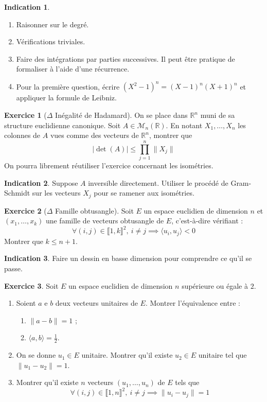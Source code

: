 \documentclass[french]{book}
\newcommand{\R}{\mathbb{R}}
\theoremstyle{definition}
\newtheorem{ex}{Exercice}[chapter]
\theoremstyle{theorem}
\newtheorem*{ind}{Indication}
\theoremstyle{remark}
\begin{document}
\begin{ind}
	\begin{enumerate}
		\item Raisonner sur le degré.
		\item Vérifications triviales.
		\item Faire des intégrations par parties successives. Il peut être pratique de formaliser à l'aide d'une récurrence.
		\item Pour la première question, écrire $(X^2-1)^n=(X-1)^n(X+1)^n$ et appliquer la formule de Leibniz.
	\end{enumerate}
\end{ind}

\begin{ex}[$\Delta$ Inégalité de Hadamard]
	On se place dans $\R^n$ muni de sa structure euclidienne canonique. Soit $A\in\mathcal{M}_n(\R)$. En notant $X_1,\ldots,X_n$ les colonnes de $A$ vues comme des vecteurs de $\R^n$, montrer que $$\lvert\det(A)\rvert\leqslant \prod_{j=1}^{n}\lVert X_j\rVert$$ On pourra librement réutiliser l'exercice concernant les isométries.
\end{ex}

\begin{ind}
	Suppose $A$ inversible directement. Utiliser le procédé de Gram-Schmidt sur les vecteurs $X_j$ pour se ramener aux isométries.
\end{ind}

\begin{ex}[$\Delta$ Famille obtusangle]
	Soit $E$ un espace euclidien de dimension $n$ et $(x_1,\ldots,x_k)$ une famille de vecteurs obtusangle de $E$, c'est-à-dire vérifiant : $$\forall (i,j)\in\llbracket1,k\rrbracket^2,\ i\ne j\implies \langle u_i,u_j\rangle<0$$ Montrer que $k\leqslant n+1$.
\end{ex}

\begin{ind}
	Faire un dessin en basse dimension pour comprendre ce qu'il se passe.
\end{ind}

\begin{ex}
	Soit $E$ un espace euclidien de dimension $n$ supérieure ou égale à $2$.
	\begin{enumerate}
		\item Soient $a$ e $b$ deux vecteurs unitaires de $E$. Montrer l'équivalence entre : 
		\begin{enumerate}[label=\roman*)]
			\item $\lVert a-b\rVert=1$ ;
			\item $\langle a,b\rangle=\displaystyle\frac{1}{2}$.
		\end{enumerate}
		\item On se donne $u_1\in E$ unitaire. Montrer qu'il existe $u_2\in E$ unitaire tel que $\lVert u_1-u_2\rVert=1$.
		\item Montrer qu'il existe $n$ vecteurs $(u_1,\ldots,u_n)$ de $E$ tels que $$\forall (i,j)\in\llbracket1,n\rrbracket^2,\ i\ne j\implies \lVert u_i-u_j\rVert=1$$
	\end{enumerate}
\end{ex}
\end{document}
